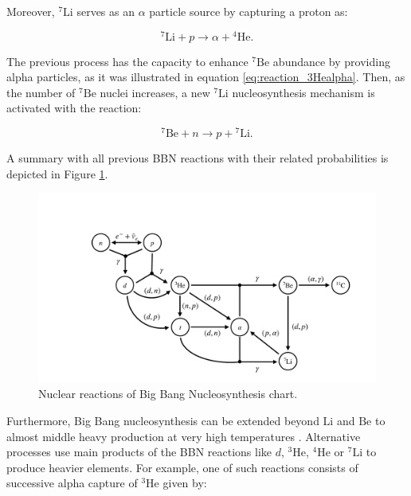 \documentclass[openany]{book}
\begin{document}
Moreover, $\mathrm{{}^{7}Li}$ serves as an $\alpha$ particle source by capturing a proton as:

\begin{equation} \label{eq:reaction_7Lip}
	\mathrm{{}^{7}Li}+ p \rightarrow \alpha + \mathrm{{}^{4}He}.
\end{equation}

The previous process has the capacity to enhance $\mathrm{{}^{7}Be}$ abundance by providing alpha particles, as it was illustrated in equation \ref{eq:reaction_3Healpha}. Then, as the number of $\mathrm{{}^{7}Be}$ nuclei increases, a new $\mathrm{{}^{7}Li}$ nucleosynthesis mechanism is activated with the reaction:


\begin{equation} \label{eq:reaction_7Ben}
	\mathrm{{}^{7}Be} + n \rightarrow p + \mathrm{{}^{7}Li}.
\end{equation}

A summary with all previous BBN reactions with their related probabilities is depicted in Figure \ref{fig:nuclearReactionsBNN}.

\begin{figure}[H]
	\centering 
	\includegraphics[scale=0.25]{Graphs/BBNchart.pdf}
	\caption[Nuclear reactions of Big Bang Nucleosynthesis]{Nuclear reactions of Big Bang Nucleosynthesis chart.}
	\label{fig:nuclearReactionsBNN}
\end{figure}


Furthermore, Big Bang nucleosynthesis can be extended beyond $\mathrm{Li}$ and $\mathrm{Be}$ to almost middle heavy production at very high temperatures \cite{wagoner_fowler_hoyle_1967}. Alternative processes use main products of the BBN reactions like $d$, $\mathrm{{}^{3}He}$, $\mathrm{{}^{4}He}$ or $\mathrm{{}^{7}Li}$ to produce heavier elements. For example, one of such reactions consists of successive alpha capture of $\mathrm{{}^{3}He}$ given by:
\end{document}

